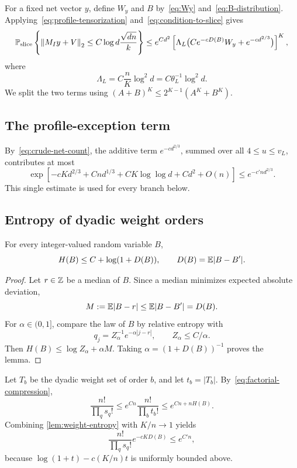 For a fixed net vector $y$, define $W_y$ and $B$ by~\eqref{eq:Wy} and~\eqref{eq:B-distribution}. Applying~\eqref{eq:profile-tensorization} and~\eqref{eq:condition-to-slice} gives
\begin{equation}\label{eq:fixed-net-slice}
  \mathbb P_{\mathrm{slice}}
  \left\{\left\|M_Iy+V\right\|_2\le C\log d\frac{\sqrt{dn}}{k}\right\}
  \le e^{Cd^2}
  \left[\Lambda_L\bigl(Ce^{-cD(B)}W_y+e^{-cd^{2/3}}\bigr)\right]^K,
\end{equation}
where
\begin{equation}\label{eq:Lambda-L}
  \Lambda_L=C\frac nK\log^2d=C\theta_L^{-1}\log^2d.
\end{equation}
We split the two terms using $(A+B)^K\le2^{K-1}(A^K+B^K)$.

\subsection{The profile-exception term}

By~\eqref{eq:crude-net-count}, the additive term $e^{-cd^{2/3}}$, summed over all $4\le u\le v_L$, contributes at most
\[
  \exp\left[-cKd^{2/3}+Cnd^{1/3}+CK\log\log d+Cd^2+O(n)\right]
  \le e^{-c'nd^{2/3}}.
\]
This single estimate is used for every branch below.

\subsection{Entropy of dyadic weight orders}

\begin{lemma}\label{lem:weight-entropy}
For every integer-valued random variable $B$,
\[
  H(B)\le C+\log(1+D(B)),
  \qquad
  D(B)=\mathbb E|B-B'|.
\]
\end{lemma}

\begin{proof}
Let $r\in\mathbb Z$ be a median of $B$. Since a median minimizes expected absolute deviation,
\[
  M:=\mathbb E|B-r|\le\mathbb E|B-B'|=D(B).
\]
For $\alpha\in(0,1]$, compare the law of $B$ by relative entropy with
\[
  q_j=Z_\alpha^{-1}e^{-\alpha|j-r|},
  \qquad
  Z_\alpha\le C/\alpha.
\]
Then $H(B)\le\log Z_\alpha+\alpha M$. Taking $\alpha=(1+D(B))^{-1}$ proves the lemma.
\end{proof}

Let $T_b$ be the dyadic weight set of order $b$, and let $t_b=|T_b|$. By~\eqref{eq:factorial-compression},
\begin{equation}\label{eq:factorial-entropy}
  \frac{n!}{\prod_qs_q!}
  \le e^{Cn}\frac{n!}{\prod_bt_b!}
  \le e^{Cn+nH(B)}.
\end{equation}
Combining 
\cref{lem:weight-entropy} with $K/n\to1$ yields
\begin{equation}\label{eq:entropy-dispersion-cancel}
  \frac{n!}{\prod_qs_q!}e^{-cKD(B)}\le e^{C'n},
\end{equation}
because $\log(1+t)-c(K/n)t$ is uniformly bounded above.

